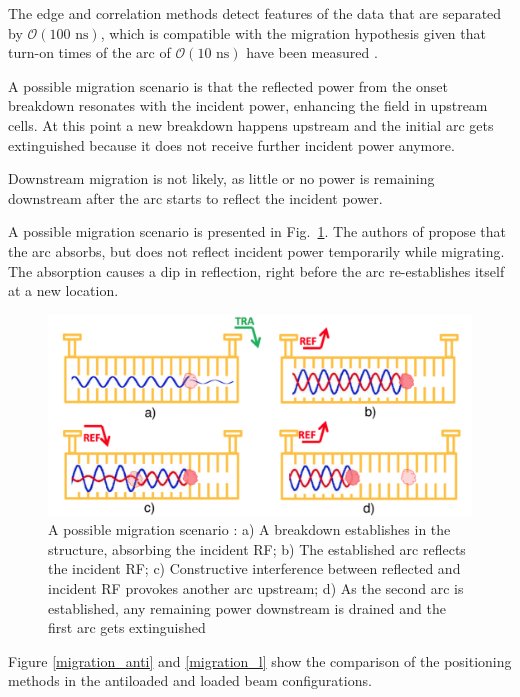 The edge and correlation methods detect features of the data that are separated by $\mathcal{O}(100 \text{ ns})$, which is compatible with the migration hypothesis given that turn-on times of the arc of $\mathcal{O}(10 \text{ ns})$ have been measured \cite{Shipman:1999457,Shipman:1459884}.





A possible migration scenario is that the reflected power from the onset breakdown resonates with the incident power, enhancing the field in upstream cells. At this point a new breakdown happens upstream and the initial arc gets extinguished because it does not receive further incident power anymore. 

Downstream migration is not likely, as little or no power is remaining downstream after the arc starts to reflect the incident power. 

A possible migration scenario is presented in Fig.~\ref{mig_sc}. The authors of \cite{Degiovanni:migration} propose that the arc absorbs, but does not reflect incident power temporarily while migrating. The absorption causes a dip in reflection, right before the arc re-establishes itself at a new location.

\begin{figure}[h]
\centering 
\includegraphics[scale=0.3]{pictures/migration_scenario}
\caption{A possible migration scenario \cite{Degiovanni:migration}: a) A breakdown establishes in the structure, absorbing the incident RF; b) The established arc reflects the incident RF; c) Constructive interference between reflected and incident RF provokes another arc upstream; d) As the second arc is established, any remaining power downstream is drained and the first arc gets extinguished}
\label{mig_sc}
\end{figure}

Figure \ref{migration_anti} and \ref{migration_l} show the comparison of the positioning methods in the antiloaded and loaded beam configurations.  


